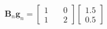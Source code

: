 \documentclass[preview]{standalone}
\begin{document}
\begin{align*}
\begin{align} \mathbf{B}_n \mathbf{g}_n = \begin{bmatrix} 1 & \quad 0 \\ 1 & \quad 2 \end{bmatrix}\begin{bmatrix} 1.5 \\ 0.5 \end{bmatrix} \end{align}
\end{align*}
\end{document}
